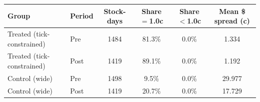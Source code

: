 \begin{tabular}{llcccc}
\toprule
Group & Period & Stock-days & Share $=$1.0c & Share $<$1.0c & Mean \$ spread (c) \\
\midrule
Treated (tick-constrained) & Pre & 1484 & 81.3\% & 0.0\% & 1.334 \\
Treated (tick-constrained) & Post & 1419 & 89.1\% & 0.0\% & 1.192 \\
Control (wide) & Pre & 1498 & 9.5\% & 0.0\% & 29.977 \\
Control (wide) & Post & 1419 & 20.7\% & 0.0\% & 17.729 \\
\bottomrule
\end{tabular}
